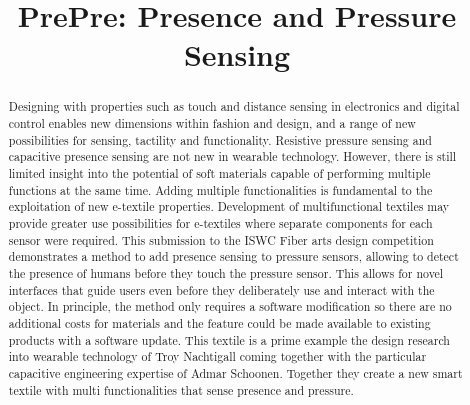 \documentclass{sigchi-ext}
\title{PrePre: Presence and Pressure Sensing}
\author{%
  \alignauthor{%
    \textbf{Troy Nachtigall}\\
    \affaddr{Eindhoven Univsersity of Technology} \\
    \affaddr{Eindhoven,  5400MB, NL} \\
    \email{t.r.nachtigall@tue.nl} }
    \alignauthor{%
    \textbf{A.M.J.M. Schoonen}\\
    \affaddr{Eindhoven, The Netherlands}\\
    \email{admar@familieschoonen.nl} } 
    }
\begin{document}
\maketitle

\RaggedRight{} 

\begin{abstract}
  Designing with properties such as touch and  distance 
  sensing in electronics and digital control enables new dimensions within fashion and design, and a range of new possibilities for sensing, tactility and functionality. Resistive pressure sensing and capacitive presence sensing are not new in wearable technology. However, there is still limited insight into the potential of soft materials capable of performing multiple functions at the same time. Adding multiple functionalities is fundamental to the exploitation of new e-textile properties. Development of multifunctional textiles may provide greater use possibilities for e-textiles where separate components for each sensor were required. This submission to the ISWC Fiber arts design competition demonstrates  a method to add presence sensing to pressure sensors, allowing to detect the presence of humans before they touch the pressure sensor.  This allows for novel interfaces that guide users even before they deliberately use and interact with the object. In principle, the method only requires a software modification so there are no
  additional costs for materials and the feature could be made available to
  existing products with a software update.   This textile is a prime example the design research into wearable technology of Troy Nachtigall coming together with the particular capacitive engineering expertise of Admar Schoonen. Together they create a new smart textile with multi functionalities that sense presence and pressure.  
\end{abstract} 
\end{document}
